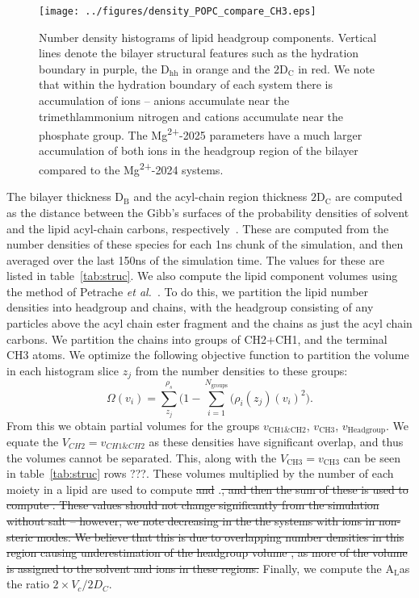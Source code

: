 \documentclass[12pt,openany,final]{book}
\newcommand{\etal}{\textit{et al.}}
\newcommand{\db}{$\text{D}_\text{B}$}
\newcommand{\dhh}{$\text{D}_\text{hh}$}
\newcommand{\dc}{$\text{2D}_\text{C}$}
\newcommand{\al}{$\text{A}_{\text{L}}$}
\newcommand{\mg}{Mg\textsuperscript{2+}}
\begin{document}
\begin{figure}[H]
    \texttt{[image: ../figures/density\_POPC\_compare\_CH3.eps]}
    \caption[Number densities of lipid headgroup moieties]{Number density histograms of lipid headgroup components. Vertical lines denote the bilayer structural features such as the hydration boundary in purple, the \dhh{} in orange and the \dc{} in red. We note
    that within the hydration boundary of each system there is accumulation of ions -- anions accumulate near the trimethlammonium nitrogen and cations accumulate near the phosphate group. The \mg{-2025} parameters
have a much larger accumulation of both ions in the headgroup region of the bilayer compared to the \mg{-2024} systems.}
    \label{fig:soldens}
\end{figure}

The bilayer thickness \db{} and the acyl-chain region thickness \dc{} are computed as the distance between the Gibb's surfaces of the probability densities of solvent and the lipid acyl-chain carbons, respectively~\cite{fogarty:2015}.
These are computed from the number densities of these species for each 1ns chunk of the simulation, and then averaged over the last 150ns of the simulation time.
The values for these are listed in table~\ref{tab:struc}.
We also compute the lipid component volumes using the method of Petrache \etal{}~\cite{petrache:1997}. To do this, we partition the lipid number densities into
headgroup and chains, with the headgroup consisting of any particles above the acyl chain ester fragment and the chains as just the acyl chain carbons. We partition the
chains into groups of CH2+CH1, and the terminal CH3 atoms. We optimize the following objective function to partition the volume in each histogram slice $z_j$ from the number densities to these groups:
\begin{equation}
    \Omega{(v_i)}=\sum^{\rho_s}_{z_j}\bigg(1-\sum^{N_{\text{groups}}}_{i=1}\big(\rho_i(z_j)(v_i)^2\bigg)\text{.}
\end{equation}
From this we obtain partial volumes for the groups $v_{\text{CH1\&CH2}}$, $v_{\text{CH3}}$, $v_{\text{Headgroup}}$. We equate the $V_{CH2}=v_{CH1\&CH2}$ as these densities have significant overlap,
and thus the volumes cannot be separated. This, along with the $V_{\text{CH3}}=v_{\text{CH3}}$ can be seen in table~\ref{tab:struc} rows ???. These volumes multiplied by the number of each
moiety in a lipid are used to compute \st{\Vh and} \Vc.\st{, and then the sum of these is used to compute \Vl. These values should not change significantly from the simulation without salt -- however, we note decreasing
\Vl in the the systems with ions
in non-steric modes.
We believe that this is due to overlapping number densities in this
region causing underestimation of the headgroup volume \Vh, as more of the volume is assigned to the solvent and ions
in these regions.}
Finally, we compute the \al as the ratio $2\times{}V_c/2D_C$.
\end{document}
